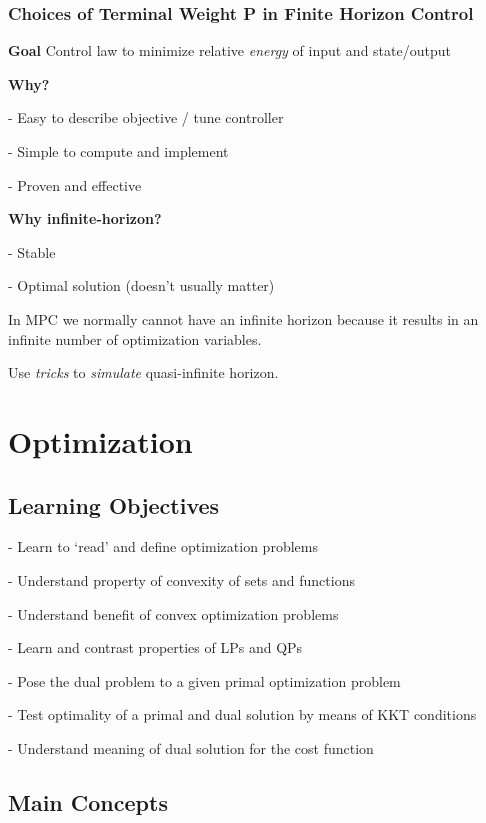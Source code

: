 
\subsubsection{Choices of Terminal Weight P in Finite Horizon Control}

\textbf{Goal} Control law to minimize relative
\textit{energy} of input and state/output

\textbf{Why?}

- Easy to describe objective / tune controller

- Simple to compute and implement

- Proven and effective

\textbf{Why infinite-horizon?}

- Stable

- Optimal solution (doesn’t usually matter)

In MPC we normally cannot have an infinite horizon because
it results in an infinite number of optimization variables.

Use \textit{tricks} to \textit{simulate} quasi-infinite horizon.

\section{Optimization}

\subsection{Learning Objectives}

- Learn to ‘read’ and define optimization problems

- Understand property of convexity of sets and functions

- Understand benefit of convex optimization problems

- Learn and contrast properties of LPs and QPs

- Pose the dual problem to a given primal optimization problem

- Test optimality of a primal and dual solution by means of KKT conditions

- Understand meaning of dual solution for the cost function

\subsection{Main Concepts}

